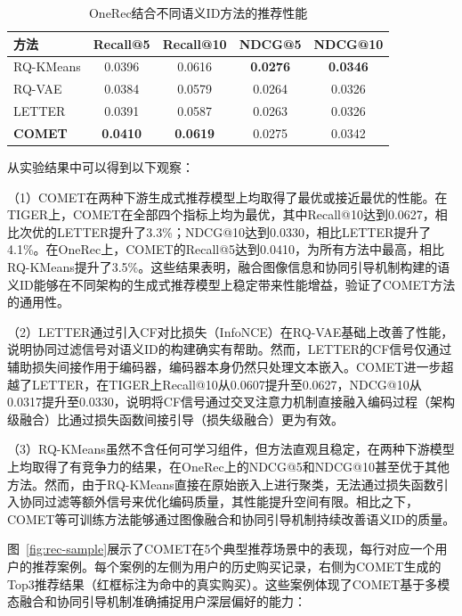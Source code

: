 \begin{table}[htbp]
  \centering
  \caption{OneRec结合不同语义ID方法的推荐性能}
  \label{tab:onerec-results}
  \begin{tabular}{lcccc}
    \toprule
    方法 & Recall@5 & Recall@10 & NDCG@5 & NDCG@10 \\
    \midrule
    RQ-KMeans\cite{onerec} & 0.0396 & 0.0616 & \textbf{0.0276} & \textbf{0.0346} \\
    RQ-VAE\cite{lee2022autoregressive} & 0.0384 & 0.0579 & 0.0264 & 0.0326 \\
    LETTER\cite{wang2024learnable} & 0.0391 & 0.0587 & 0.0263 & 0.0326 \\
    \textbf{COMET} & \textbf{0.0410} & \textbf{0.0619} & 0.0275 & 0.0342 \\
    \bottomrule
  \end{tabular}

\end{table}

从实验结果中可以得到以下观察：

（1）COMET在两种下游生成式推荐模型上均取得了最优或接近最优的性能。在TIGER上，COMET在全部四个指标上均为最优，其中Recall@10达到0.0627，相比次优的LETTER提升了3.3\%；NDCG@10达到0.0330，相比LETTER提升了4.1\%。在OneRec上，COMET的Recall@5达到0.0410，为所有方法中最高，相比RQ-KMeans提升了3.5\%。这些结果表明，融合图像信息和协同引导机制构建的语义ID能够在不同架构的生成式推荐模型上稳定带来性能增益，验证了COMET方法的通用性。

（2）LETTER通过引入CF对比损失（InfoNCE）在RQ-VAE基础上改善了性能，说明协同过滤信号对语义ID的构建确实有帮助。然而，LETTER的CF信号仅通过辅助损失间接作用于编码器，编码器本身仍然只处理文本嵌入。COMET进一步超越了LETTER，在TIGER上Recall@10从0.0607提升至0.0627，NDCG@10从0.0317提升至0.0330，说明将CF信号通过交叉注意力机制直接融入编码过程（架构级融合）比通过损失函数间接引导（损失级融合）更为有效。

（3）RQ-KMeans虽然不含任何可学习组件，但方法直观且稳定，在两种下游模型上均取得了有竞争力的结果，在OneRec上的NDCG@5和NDCG@10甚至优于其他方法。然而，由于RQ-KMeans直接在原始嵌入上进行聚类，无法通过损失函数引入协同过滤等额外信号来优化编码质量，其性能提升空间有限。相比之下，COMET等可训练方法能够通过图像融合和协同引导机制持续改善语义ID的质量。

图~\ref{fig:rec-sample}展示了COMET在5个典型推荐场景中的表现，每行对应一个用户的推荐案例。每个案例的左侧为用户的历史购买记录，右侧为COMET生成的Top3推荐结果（红框标注为命中的真实购买）。这些案例体现了COMET基于多模态融合和协同引导机制准确捕捉用户深层偏好的能力：

